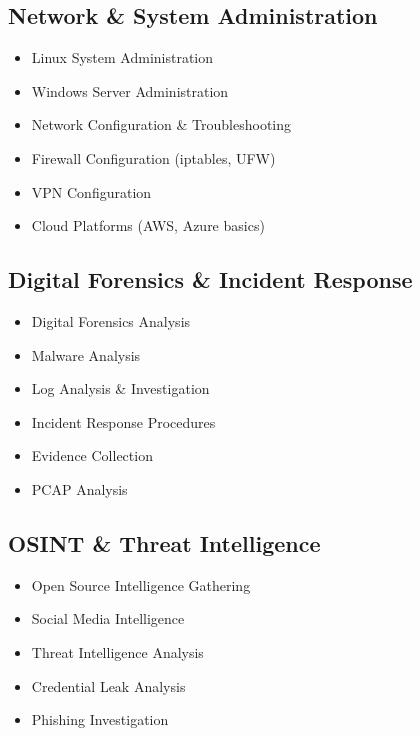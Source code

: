 \documentclass[11pt,a4paper]{article}
\begin{document}
\begin{multicols}{2}
\subsection{Network \& System Administration}
\begin{itemize}[leftmargin=0.15in, label={}]
\small{\item{
\begin{itemize}
\item Linux System Administration
\item Windows Server Administration
\item Network Configuration \& Troubleshooting
\item Firewall Configuration (iptables, UFW)
\item VPN Configuration
\item Cloud Platforms (AWS, Azure basics)
\end{itemize}
}}
\end{itemize}

\subsection{Digital Forensics \& Incident Response}
\begin{itemize}[leftmargin=0.15in, label={}]
\small{\item{
\begin{itemize}
\item Digital Forensics Analysis
\item Malware Analysis
\item Log Analysis \& Investigation
\item Incident Response Procedures
\item Evidence Collection
\item PCAP Analysis
\end{itemize}
}}
\end{itemize}

\subsection{OSINT \& Threat Intelligence}
\begin{itemize}[leftmargin=0.15in, label={}]
\small{\item{
\begin{itemize}
\item Open Source Intelligence Gathering
\item Social Media Intelligence
\item Threat Intelligence Analysis
\item Credential Leak Analysis
\item Phishing Investigation
\end{itemize}
}}
\end{itemize}
\end{multicols}
\end{document}
